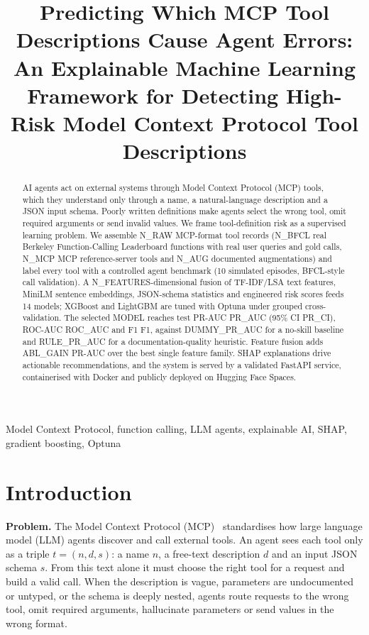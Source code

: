 \documentclass[conference]{IEEEtran}
\begin{document}
\title{Predicting Which MCP Tool Descriptions Cause Agent Errors: An Explainable Machine Learning Framework for Detecting High-Risk Model Context Protocol Tool Descriptions}
\author{
}
\maketitle

\begin{abstract}
AI agents act on external systems through Model Context Protocol (MCP) tools, which they understand only through a name, a natural-language description and a JSON input schema. Poorly written definitions make agents select the wrong tool, omit required arguments or send invalid values. We frame tool-definition risk as a supervised learning problem. We assemble {{N_RAW}} MCP-format tool records ({{N_BFCL}} real Berkeley Function-Calling Leaderboard functions with real user queries and gold calls, {{N_MCP}} MCP reference-server tools and {{N_AUG}} documented augmentations) and label every tool with a controlled agent benchmark (10 simulated episodes, BFCL-style call validation). A {{N_FEATURES}}-dimensional fusion of TF-IDF/LSA text features, MiniLM sentence embeddings, JSON-schema statistics and engineered risk scores feeds 14 models; XGBoost and LightGBM are tuned with Optuna under grouped cross-validation. The selected {{MODEL}} reaches test PR-AUC {{PR_AUC}} (95\% CI {{PR_CI}}), ROC-AUC {{ROC_AUC}} and F1 {{F1}}, against {{DUMMY_PR_AUC}} for a no-skill baseline and {{RULE_PR_AUC}} for a documentation-quality heuristic. Feature fusion adds {{ABL_GAIN}} PR-AUC over the best single feature family. SHAP explanations drive actionable recommendations, and the system is served by a validated FastAPI service, containerised with Docker and publicly deployed on Hugging Face Spaces.
\end{abstract}
\begin{IEEEkeywords}Model Context Protocol, function calling, LLM agents, explainable AI, SHAP, gradient boosting, Optuna\end{IEEEkeywords}

\section{Introduction}
\textbf{Problem.} The Model Context Protocol (MCP)~\cite{mcp,mcpsurvey} standardises how large language model (LLM) agents discover and call external tools. An agent sees each tool only as a triple $t=(n,d,s)$: a name $n$, a free-text description $d$ and an input JSON schema $s$. From this text alone it must choose the right tool for a request and build a valid call. When the description is vague, parameters are undocumented or untyped, or the schema is deeply nested, agents route requests to the wrong tool, omit required arguments, hallucinate parameters or send values in the wrong format.
\end{document}
